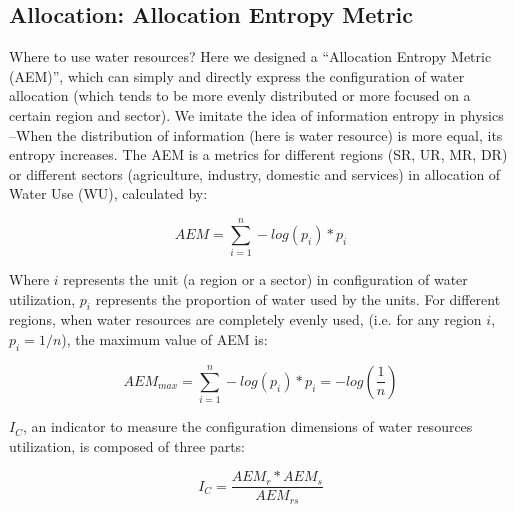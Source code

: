 \documentclass[9pt,twoside,lineno]{pnas-new}
\begin{document}
\subsection*{Allocation: Allocation Entropy Metric}
    Where to use water resources? 
    Here we designed a ``Allocation Entropy Metric (AEM)'', which can simply and directly express the configuration of water allocation (which tends to be more evenly distributed or more focused on a certain region and sector). 
    We imitate the idea of information entropy in physics --When the distribution of information (here is water resource) is more equal, its entropy increases.
    The AEM is a metrics for different regions (SR, UR, MR, DR) or different sectors (agriculture, industry, domestic and services) in allocation of Water Use (WU), calculated by:

    $$ AEM = \sum_{i=1}^n -log(p_{i}) * p_{i} $$

    Where $i$ represents the unit (a region or a sector) in configuration of water utilization, $p_i$ represents the proportion of water used by the units.
    For different regions, when water resources are completely evenly used, (i.e. for any region $i$, $p_i = 1/n $), the maximum value of AEM is:

    $$ AEM_{max} = \sum_{i=1}^n -log(p_{i}) * p_{i} = - log(\frac{1}{n}) $$

    $I_C$, an indicator to measure the configuration dimensions of water resources utilization, is composed of three parts:

    $$ I_C = \frac{AEM_{r}*AEM_{s}}{AEM_{rs}}$$
    
\end{document}
